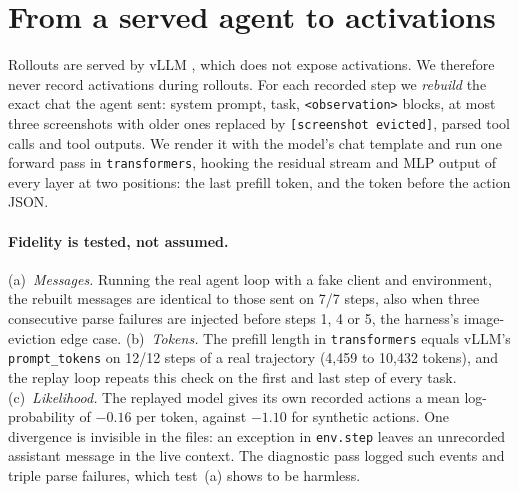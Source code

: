 \section{From a served agent to activations}
\label{sec:replay}

Rollouts are served by vLLM \citep{kwon2023vllm}, which does not expose activations. We therefore never record activations during rollouts. For each recorded step we \emph{rebuild} the exact chat the agent sent: system prompt, task, \texttt{<observation>} blocks, at most three screenshots with older ones replaced by \texttt{[screenshot evicted]}, parsed tool calls and tool outputs. We render it with the model's chat template and run one forward pass in \texttt{transformers}, hooking the residual stream and MLP output of every layer at two positions: the last prefill token, and the token before the action JSON.

\paragraph{Fidelity is tested, not assumed.}
(a)~\emph{Messages.} Running the real agent loop with a fake client and environment, the rebuilt messages are identical to those sent on 7/7 steps, also when three consecutive parse failures are injected before steps 1, 4 or 5, the harness's image-eviction edge case. %
(b)~\emph{Tokens.} The prefill length in \texttt{transformers} equals vLLM's \texttt{prompt\_tokens} on 12/12 steps of a real trajectory (4{,}459 to 10{,}432 tokens), and the replay loop repeats this check on the first and last step of every task. %
(c)~\emph{Likelihood.} The replayed model gives its own recorded actions a mean log-probability of $-0.16$ per token, against $-1.10$ for synthetic actions. %
One divergence is invisible in the files: an exception in \texttt{env.step} leaves an unrecorded assistant message in the live context. The diagnostic pass logged \bEnvFail{} such events and \bParseFail{} triple parse failures, which test~(a) shows to be harmless.
